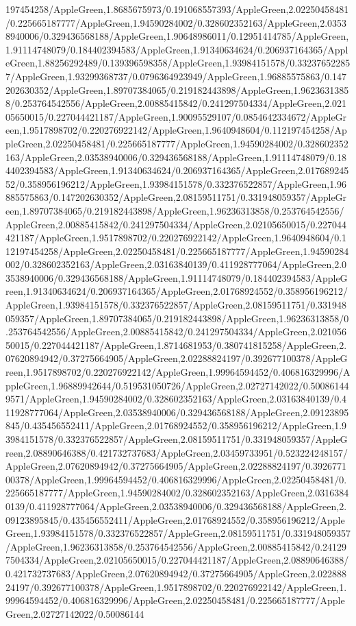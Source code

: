 {\begin{tikzternal}
{197454258/AppleGreen,1.8685675973/0.191068557393/AppleGreen,2.02250458481/0.225665187777/AppleGreen,1.94590284002/0.328602352163/AppleGreen,2.03538940006/0.329436568188/AppleGreen,1.90648986011/0.12951414785/AppleGreen,1.91114748079/0.184402394583/AppleGreen,1.91340634624/0.206937164365/AppleGreen,1.88256292489/0.139396598358/AppleGreen,1.93984151578/0.332376522857/AppleGreen,1.93299368737/0.0796364923949/AppleGreen,1.96885575863/0.147202630352/AppleGreen,1.89707384065/0.219182443898/AppleGreen,1.96236313858/0.253764542556/AppleGreen,2.00885415842/0.241297504334/AppleGreen,2.02105650015/0.227044421187/AppleGreen,1.90095529107/0.0854642334672/AppleGreen,1.9517898702/0.220276922142/AppleGreen,1.9640948604/0.112197454258/AppleGreen,2.02250458481/0.225665187777/AppleGreen,1.94590284002/0.328602352163/AppleGreen,2.03538940006/0.329436568188/AppleGreen,1.91114748079/0.184402394583/AppleGreen,1.91340634624/0.206937164365/AppleGreen,2.01768924552/0.358956196212/AppleGreen,1.93984151578/0.332376522857/AppleGreen,1.96885575863/0.147202630352/AppleGreen,2.08159511751/0.331948059357/AppleGreen,1.89707384065/0.219182443898/AppleGreen,1.96236313858/0.253764542556/AppleGreen,2.00885415842/0.241297504334/AppleGreen,2.02105650015/0.227044421187/AppleGreen,1.9517898702/0.220276922142/AppleGreen,1.9640948604/0.112197454258/AppleGreen,2.02250458481/0.225665187777/AppleGreen,1.94590284002/0.328602352163/AppleGreen,2.03163840139/0.411928777064/AppleGreen,2.03538940006/0.329436568188/AppleGreen,1.91114748079/0.184402394583/AppleGreen,1.91340634624/0.206937164365/AppleGreen,2.01768924552/0.358956196212/AppleGreen,1.93984151578/0.332376522857/AppleGreen,2.08159511751/0.331948059357/AppleGreen,1.89707384065/0.219182443898/AppleGreen,1.96236313858/0.253764542556/AppleGreen,2.00885415842/0.241297504334/AppleGreen,2.02105650015/0.227044421187/AppleGreen,1.8714681953/0.380741815258/AppleGreen,2.07620894942/0.37275664905/AppleGreen,2.02288824197/0.392677100378/AppleGreen,1.9517898702/0.220276922142/AppleGreen,1.99964594452/0.406816329996/AppleGreen,1.96889942644/0.519531050726/AppleGreen,2.02727142022/0.500861449571/AppleGreen,1.94590284002/0.328602352163/AppleGreen,2.03163840139/0.411928777064/AppleGreen,2.03538940006/0.329436568188/AppleGreen,2.09123895845/0.435456552411/AppleGreen,2.01768924552/0.358956196212/AppleGreen,1.93984151578/0.332376522857/AppleGreen,2.08159511751/0.331948059357/AppleGreen,2.08890646388/0.421732737683/AppleGreen,2.03459733951/0.523224248157/AppleGreen,2.07620894942/0.37275664905/AppleGreen,2.02288824197/0.392677100378/AppleGreen,1.99964594452/0.406816329996/AppleGreen,2.02250458481/0.225665187777/AppleGreen,1.94590284002/0.328602352163/AppleGreen,2.03163840139/0.411928777064/AppleGreen,2.03538940006/0.329436568188/AppleGreen,2.09123895845/0.435456552411/AppleGreen,2.01768924552/0.358956196212/AppleGreen,1.93984151578/0.332376522857/AppleGreen,2.08159511751/0.331948059357/AppleGreen,1.96236313858/0.253764542556/AppleGreen,2.00885415842/0.241297504334/AppleGreen,2.02105650015/0.227044421187/AppleGreen,2.08890646388/0.421732737683/AppleGreen,2.07620894942/0.37275664905/AppleGreen,2.02288824197/0.392677100378/AppleGreen,1.9517898702/0.220276922142/AppleGreen,1.99964594452/0.406816329996/AppleGreen,2.02250458481/0.225665187777/AppleGreen,2.02727142022/0.50086144}
\end{tikzternal}}
